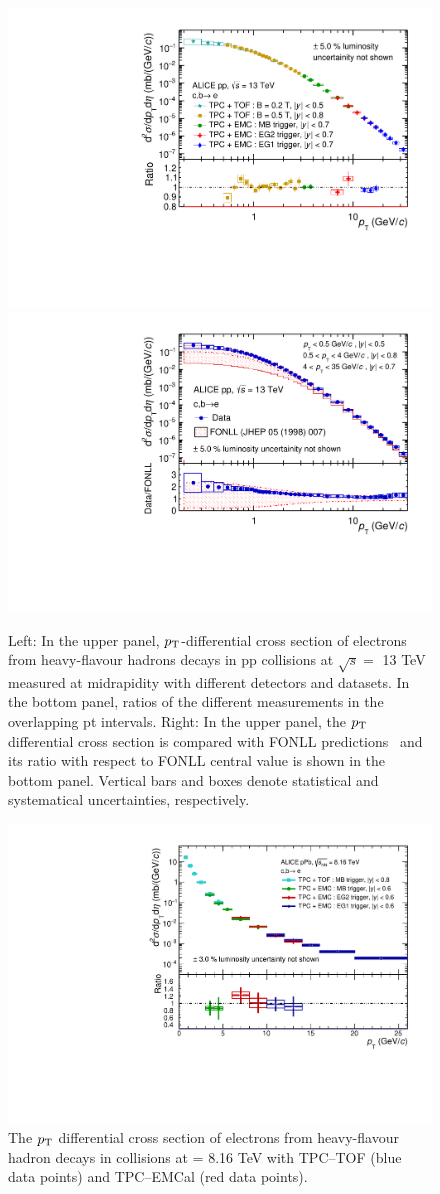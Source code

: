 \begin{figure}[!ht]
\centering

\includegraphics[width=0.48\linewidth]{figures/Results/HFE_ppNormalB/HFE_Comparison_1.pdf}
\includegraphics[width=0.48\linewidth]{figures/Results/HFE_ppNormalB/Data_FONLL_HFE_1.pdf}
\caption{Left: In the upper panel, $p_{\rm T}$-differential cross section of electrons from heavy-flavour hadrons decays in pp collisions at $\sqrt{s} =$ 13 TeV measured at midrapidity with different detectors and datasets. In the bottom panel, ratios of the different measurements in the overlapping pt intervals. Right: In the upper panel, the $p_{\rm{T}}$ differential cross section is compared with FONLL predictions~\cite{Cacciari:1998it} and its ratio with respect to FONLL central value is shown in the bottom panel. Vertical bars and boxes denote statistical and systematical uncertainties, respectively.}        
\label{Fig:ppHFESpectra}
\end{figure}

\begin{figure}[!ht]
\centering
\includegraphics[width=0.5\linewidth]{figures/Results/HFE_pPb/HFE_InvariantCrossSection_pPb.pdf}
\caption{The $p_{\rm{T}}$ differential cross section of electrons from heavy-flavour hadron decays in \pPb collisions at \sqrtsNN = 8.16 TeV with TPC--TOF (blue data points) and TPC--EMCal (red data points).}        
\label{Fig:pPbHFESpectra}
\end{figure}

